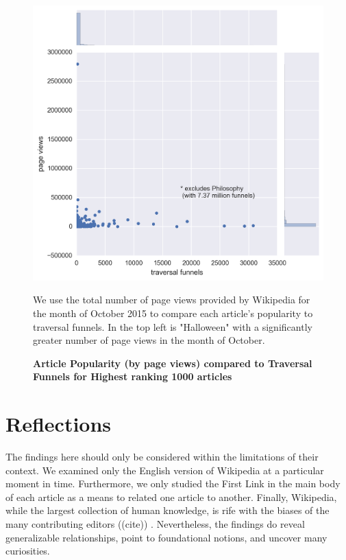 \documentclass[pre,twocolumn,twoside,superscriptaddress,floatfix, aps, 10pt]{revtex4-1}
\begin{document}
\begin{figure}[tp!]
  \centering	
  \includegraphics[width=\columnwidth]{graphics/funnels_visits.png}
  \caption{
    \textbf{Article Popularity (by page views) compared to Traversal Funnels
    for Highest ranking 1000 articles}
  }
    We use the total number of page views provided by Wikipedia for the month
    of October 2015 to compare each article's popularity to traversal funnels.
    In the top left is "Halloween" with a significantly greater 
    number of page views in the month of October.
  \label{fig:Views and Funnels}
\end{figure}




\section{Reflections}

The findings here should only be considered within the limitations of their context.
We examined only the English version of Wikipedia at a particular moment in time.
Furthermore, we only studied the First Link in the main body  of each article
as a means to related one article to another. Finally, Wikipedia, while the largest 
collection of human knowledge, is rife with the biases of the many contributing editors ((cite))
. Nevertheless, the findings do reveal
generalizable relationships, point to foundational notions, and uncover many curiosities.
\end{document}

